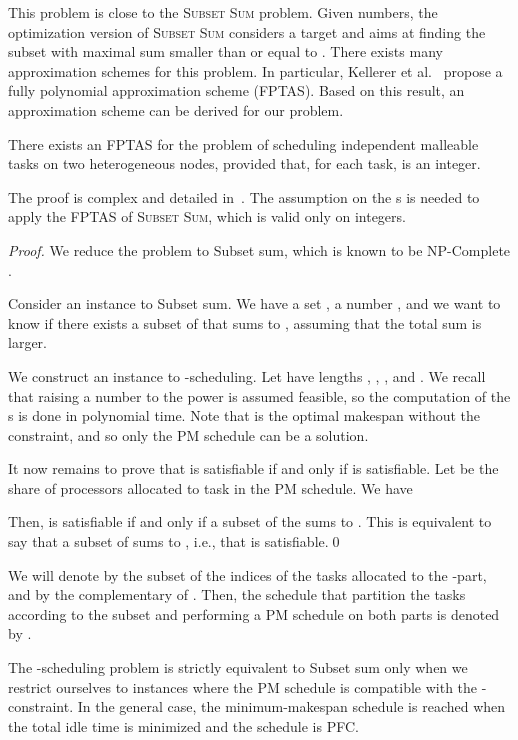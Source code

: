 \documentclass{llncs}
\newif\iflong
\begin{document}
\iflong \else This problem is close to the \textsc{Subset Sum} problem. Given 
numbers, the optimization version of \textsc{Subset Sum} considers a
target  and aims at finding the subset with maximal sum smaller
than or equal to .  There exists many approximation schemes for
this problem. In particular, Kellerer et
al.~\cite{kellerer2003efficient} propose a fully polynomial
approximation scheme (FPTAS). Based on this result, an approximation
scheme can be derived for our problem.
\begin{theorem}
  There exists an FPTAS for the problem of scheduling independent
  malleable tasks on two heterogeneous nodes, provided that, for each
  task,  is an integer.
\end{theorem}

The proof is complex and detailed in~\cite{RR-ipdps-2014}. The
assumption on the s is needed to apply the FPTAS of
\textsc{Subset Sum}, which is valid only on integers.
\fi 

\iflong \begin{proof}
We reduce the problem to {\sc Subset sum}, which is known to be NP-Complete \cite{gareyjohnson}.

Consider an instance  to {\sc Subset sum}. We have a set , a number , and we want to know if there exists a subset of  that sums to , assuming that the total sum is larger.

We construct an instance  to -scheduling. Let  have lengths , , , and . We recall that raising a number to the power  is assumed feasible, so the computation of the s is done in polynomial time. Note that  is the optimal makespan without the  constraint, and so only the PM schedule can be a solution.

It now remains to prove that  is satisfiable if and only if  is satisfiable.
Let  be the share of processors allocated to task  in the PM schedule. We have 

Then,  is satisfiable if and only if a subset of the   sums to . This is equivalent to say that a subset of  sums to , i.e., that  is satisfiable.\qed
\end{proof}



We will denote by  the subset of the indices of the tasks allocated
to the -part, and by  the complementary of . Then, the
schedule that partition the tasks according to the subset  and
performing a PM schedule on both parts is denoted by .



The -scheduling problem is strictly equivalent to {\sc Subset sum} only when we restrict ourselves to instances where the PM schedule is compatible with the -constraint. In the general case, the minimum-makespan schedule is reached when  the total idle time is minimized and the schedule is PFC.
\end{document}
